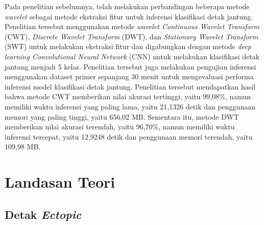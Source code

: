 Pada penelitian sebelumnya, \textcite{sururiComparisonSeveralWavelet2023} telah melakukan perbandingan beberapa metode \textit{wavelet} sebagai metode ekstraksi fitur untuk inferensi klasifikasi detak jantung. 
Penelitian tersebut menggunakan metode \textit{wavelet Continuous Wavelet Transform} (CWT), \textit{Discrete Wavelet Transform} (DWT), dan \textit{Stationary Wavelet Transform} (SWT) untuk melakukan ekstraksi fitur dan digabungkan dengan metode \textit{deep learning Convolutional Neural Network} (CNN) untuk melakukan klasifikasi detak jantung menjadi 5 kelas.
Penelitian tersebut juga melakukan pengujian inferensi menggunakan dataset primer sepanjang 30 menit untuk mengevaluasi performa inferensi model klasifikasi detak jantung.
Penelitian tersebut mendapatkan hasil bahwa metode CWT memberikan nilai akurasi tertinggi, yaitu 99,08\%, namun memiliki waktu inferensi yang paling lama, yaitu 21,1326 detik dan penggunaan memori yang paling tinggi, yaitu 656,02 MB.
Sementara itu, metode DWT memberikan nilai akurasi terendah, yaitu 96,70\%, namun memiliki waktu inferensi tercepat, yaitu 12,9248 detik dan penggunaan memori terendah, yaitu 109,98 MB.


\section{Landasan Teori}



\subsection{Detak \textit{Ectopic}}
\label{subsec: landasan-ectopic}

%


